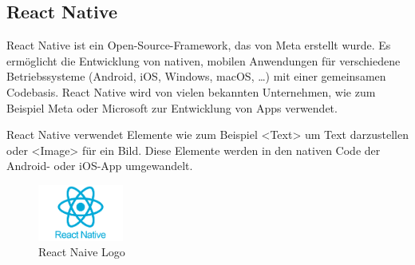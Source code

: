 \subsection{React Native}
\label{sec:reactnative}

React Native ist ein \Gls{Open-Source}-\Gls*{Framework}, das von Meta erstellt wurde. Es ermöglicht die Entwicklung von nativen, mobilen Anwendungen für verschiedene Betriebssysteme (Android, iOS, Windows, macOS, …) mit einer gemeinsamen Codebasis. React Native wird von vielen bekannten Unternehmen, wie zum Beispiel Meta oder Microsoft zur Entwicklung von Apps verwendet.

\noindent React Native verwendet Elemente wie zum Beispiel <Text> um Text darzustellen oder <Image> für ein Bild. Diese Elemente werden in den nativen Code der Android- oder iOS-App umgewandelt. 

\begin{figure}[H]
    \centering
    \includegraphics[width=0.25\textwidth]{images/reactnativelogo.png}
    \caption{React Naive Logo }
    \label{fig:reactnativelogo}
\end{figure}
